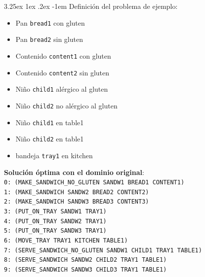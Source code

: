 \documentclass{article}
\makeatletter
\newcommand{\cool}[1] {
        {\texttt{#1}}
    }
\renewcommand\paragraph{\@startsection{paragraph}{5}{\z@}%
      {3.25ex \@plus1ex \@minus.2ex}%
      {-1em}%
      {\normalfont\normalsize\bfseries}}
\makeatother
\begin{document}
    \paragraph{}
    Definición del problema de ejemplo:
    \begin{itemize}
        \item Pan \cool{bread1} con gluten
        \item Pan \cool{bread2} sin gluten
        \item Contenido \cool{content1} con gluten
        \item Contenido \cool{content2} sin gluten
        \item Niño \cool{child1} alérgico al gluten
        \item Niño \cool{child2} no alérgico al gluten
        \item Niño \cool{child1} en table1
        \item Niño \cool{child2} en table1
        \item bandeja \cool{tray1} en kitchen
    \end{itemize}
    
    \textbf{Solución óptima con el dominio original}: \\
    
    \noindent \cool{0: (MAKE\_SANDWICH\_NO\_GLUTEN SANDW1 BREAD1 CONTENT1) \\
    1: (MAKE\_SANDWICH SANDW2 BREAD2 CONTENT2) \\
    2: (MAKE\_SANDWICH SANDW3 BREAD3 CONTENT3) \\
    3: (PUT\_ON\_TRAY SANDW1 TRAY1) \\
    4: (PUT\_ON\_TRAY SANDW2 TRAY1) \\
    5: (PUT\_ON\_TRAY SANDW3 TRAY1) \\
    6: (MOVE\_TRAY TRAY1 KITCHEN TABLE1) \\
    7: (SERVE\_SANDWICH\_NO\_GLUTEN SANDW1 CHILD1 TRAY1 TABLE1) \\
    8: (SERVE\_SANDWICH SANDW2 CHILD2 TRAY1 TABLE1) \\
    9: (SERVE\_SANDWICH SANDW3 CHILD3 TRAY1 TABLE1) \\}
    
\end{document}
